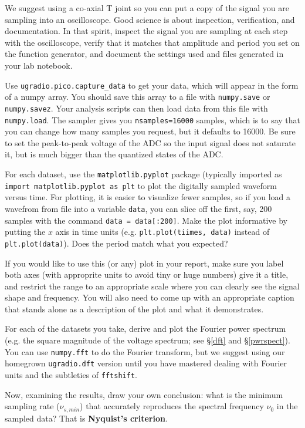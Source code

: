 \documentclass[12pt,preprint]{aastex}
\begin{document}
\noindent We suggest using a co-axial T joint so
you can put a copy of the signal you are sampling into an oscilloscope.
Good science is about inspection, verification, and documentation. In that spirit,
inspect the signal you are sampling at each step with the oscilloscope, verify that it matches that amplitude
and period you set on the function generator, and document the settings used and files generated
in your lab notebook.

Use {\tt ugradio.pico.capture\_data} to get your data, which will appear in the form
of a numpy array.  You should save this array to a file
with {\tt numpy.save} or {\tt numpy.savez}.  Your analysis scripts can then 
load data from this file with {\tt numpy.load}.
The sampler gives you {\tt nsamples=16000} samples, which is to
say that you can change how many samples you request, but it defaults to 16000. 
Be sure to set the
peak-to-peak voltage of the ADC so the input signal does not saturate it, but is much
bigger than the quantized states of the ADC.

For each dataset, use the {\tt matplotlib.pyplot} package (typically imported
as {\tt import matplotlib.pyplot as plt} to plot
the digitally sampled waveform versus
time.  
For plotting, it is easier to visualize fewer samples, so if you load a wavefrom from file into
a variable {\tt data}, you can slice off the first, say, 200 samples with the command {\tt data = data[:200]}.
Make the plot informative by putting the $x$ axis in time units (e.g. {\tt plt.plot(tiimes, data)} instead of {\tt plt.plot(data)}). 
Does the period match what you expected?

If you would like to use this (or any) plot in your report, make sure you label both axes (with
approprite units to avoid tiny or huge numbers)
give it a title, and restrict the range to an appropriate scale where you can clearly see
the signal shape and frequency. You will also need to come up with an appropriate caption that
stands alone as a description of the plot and what it demonstrates.

For each of the datasets you take, derive and plot the Fourier power spectrum
(e.g. the square magnitude of the voltage spectrum; see \S\ref{dft} and \S\ref{pwrspect}). You can use {\tt numpy.fft} to do the Fourier
transform, 
but we suggest using our homegrown {\tt ugradio.dft} version until you have mastered dealing with
Fourier units and the subtleties of {\tt fftshift}.

Now, examining the results, draw your own conclusion: what is the
minimum sampling rate ($\nu_{s,min}$) that accurately reproduces the spectral frequency $\nu_0$ in
the sampled data?  That is {\bf Nyquist's criterion}. 
\end{document}
